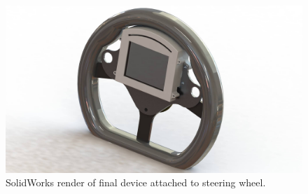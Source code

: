 \begin{figure}[H]
\begin{center}
\includegraphics[width=12cm]{Figures/device_render_wheel.jpg}
\end{center}
\caption{SolidWorks render of final device attached to steering wheel.}
\label{fig:device_render_wheel}
\end{figure}
